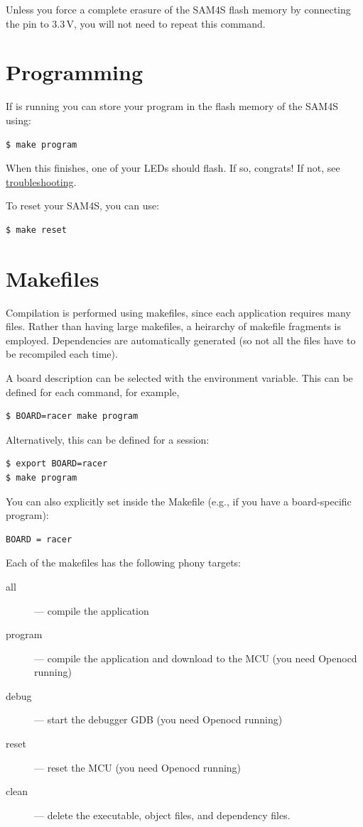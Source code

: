 Unless you force a complete erasure of the SAM4S flash memory by
connecting the  pin to 3.3\,V, you will not need to repeat
this command.

\section{Programming}
\label{programming}

If  is running you can store your program in the flash
memory of the SAM4S using:

\begin{verbatim}
$ make program
\end{verbatim}

When this finishes, one of your LEDs should flash. If so, congrats! If
not, see \protect\hyperref[troubleshooting]{troubleshooting}.

To reset your SAM4S, you can use:
%
\begin{verbatim}
$ make reset
\end{verbatim}


\section{Makefiles}

Compilation is performed using makefiles, since each application
requires many files.  Rather than having large makefiles, a heirarchy
of makefile fragments is employed.  Dependencies are automatically
generated (so not all the files have to be recompiled each time).

A board description can be selected with the  environment
variable.  This can be defined for each command, for example,
%
\begin{verbatim}
$ BOARD=racer make program
\end{verbatim}


Alternatively, this can be defined for a session:
%
\begin{verbatim}
$ export BOARD=racer
$ make program
\end{verbatim}

You can also explicitly set  inside the Makefile (e.g., if
you have a board-specific program):
%
\begin{verbatim}
BOARD = racer
\end{verbatim}

Each of the makefiles has the following phony targets:
%
\begin{description}
\item[all]  --- compile the application
\item[program] --- compile the application and download to the MCU (you need Openocd running)
\item[debug] --- start the debugger GDB (you need Openocd running)
\item[reset] --- reset the MCU (you need Openocd running)
\item[clean] --- delete the executable, object files, and dependency files.
\end{description}
